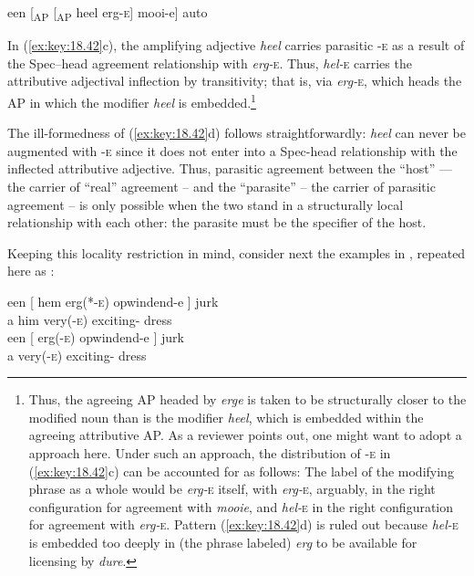 \documentclass[output=paper]{langsci/langscibook}
\begin{document}
\ea%
    \label{ex:key:18.45}
    een [\textsubscript{AP} [\textsubscript{AP} heel erg-\textsc{e}] mooi\textsubscript{}-e] auto
\z

In (\ref{ex:key:18.42}c), the amplifying adjective \emph{heel} carries parasitic
\textsc{-e} as a result of the Spec--head agreement relationship with
\emph{erg-}\textsc{e}. Thus, \emph{hel-}\textsc{e} carries the attributive
adjectival inflection by transitivity; that is, via \emph{erg-}\textsc{e},
which heads the AP in which the modifier \emph{heel} is
embedded.\footnote{Thus, the agreeing AP headed by \emph{erge} is taken to be
structurally closer to the modified noun than is the modifier \emph{heel},
which is embedded within the agreeing attributive AP. As a reviewer points out,
one might want to adopt a  approach here. Under such an
approach, the distribution of \textsc{-e} in (\ref{ex:key:18.42}c) can be accounted
for as follows: The label of the modifying phrase as a whole would be
\emph{erg-}\textsc{e} itself, with \emph{erg-}\textsc{e}, arguably, in the
right configuration for agreement with \emph{mooie}, and \emph{hel-}\textsc{e}
in the right configuration for agreement with \emph{erg-}\textsc{e}. Pattern
(\ref{ex:key:18.42}d) is ruled out because \emph{hel-}\textsc{e} is embedded too
deeply in (the phrase labeled) \emph{erg} to be available for licensing by
\emph{dure}.}

The ill-formedness of (\ref{ex:key:18.42}d) follows straightforwardly: \emph{heel}
can never be augmented with \textsc{-e} since it does not enter into a
Spec-head relationship with the inflected attributive adjective. Thus,
parasitic agreement between the \enquote{host} — the carrier of \enquote{real}
agreement – and the \enquote{parasite} – the carrier of parasitic agreement –
is only possible when the two stand in a structurally local relationship with
each other: the parasite must be the specifier of the host.

Keeping this locality restriction in mind, consider next the examples in
, repeated here as :

\ea%
    \label{ex:key:18.46}
	\ea
	\gll een [ hem  erg(*-\textsc{e})  opwindend-e ]    jurk\\
    a   {}     him  very(-\textsc{e})    exciting-\Agr{} {} dress\\
	\ex
	\gll een [ erg(-\textsc{e})    opwindend-e ]    jurk \\
    a   {}   very(-\textsc{e})    exciting-\Agr{} {} dress\\
	\z
\z
\end{document}
